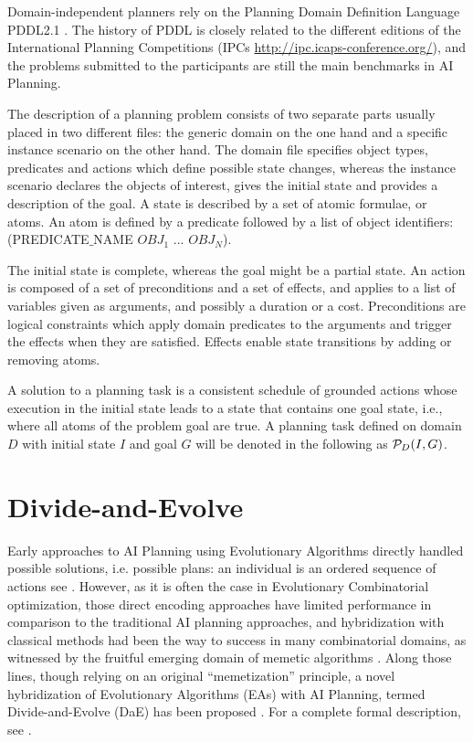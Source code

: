\documentclass{acm_proc_article-sp}
\begin{document}
Domain-independent planners rely on the Planning Domain Definition Language PDDL2.1 \cite{Fox-JAIR-2003}. The history of PDDL is closely related to the different editions of the International Planning Competitions (IPCs \url{http://ipc.icaps-conference.org/}), and the problems submitted to the participants are still the main benchmarks in AI Planning.

The description of a planning problem consists of two separate parts usually placed in two different files: the generic domain on the one hand and a specific instance scenario on the other hand. The domain file specifies object types, predicates and actions which define possible state changes, whereas the instance scenario declares the objects of interest, gives the initial state and provides a description of the goal. A state is described by a set of atomic formulae, or atoms. An atom is defined by a predicate followed by a list of object identifiers: (PREDICATE$\_$NAME $OBJ_1$ ... $OBJ_N$). 

The initial state is complete, whereas the goal might be a partial state. An action is composed of a set of preconditions and a set of effects, and applies to a list of variables given as arguments, and possibly a duration or a cost. Preconditions are logical constraints which apply domain predicates to the arguments and trigger the effects when they are satisfied. Effects enable state transitions by adding or removing atoms.

A solution to a planning task is a consistent schedule of grounded actions whose execution in the initial state leads to a state that contains one goal state, i.e., where all atoms of the problem goal are true. A planning task defined on domain $D$ with initial state $I$ and goal $G$ will be denoted in the following as ${\cal P}_D(I,G)$.

\section{Divide-and-Evolve}

\label{section:dae}

Early approaches to AI Planning using Evolutionary Algorithms directly handled possible solutions, i.e. possible plans: an individual is an ordered sequence of actions see \cite{Spector-AAAI-94,muslea97,westerberg:2000,westerberg:2001,Morignot-2005}. However, as it is often the case in Evolutionary Combinatorial optimization, those direct encoding approaches have limited performance in comparison to the traditional AI planning approaches, and hybridization with classical methods had been the way to success in many combinatorial domains, as witnessed by the fruitful emerging domain of memetic algorithms \cite{MemeticBook:2005}. Along those lines, though relying on an original ``memetization'' principle, a novel hybridization of Evolutionary Algorithms (EAs) with AI Planning, termed Divide-and-Evolve (DaE) has been proposed \cite{DAE:EvoCOP06,DAE:book-2007}. For a complete formal description, see \cite{Bibai:ICAPS2010}.
\end{document}
